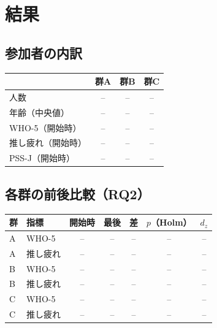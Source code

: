 \section{結果}

\subsection{参加者の内訳}

\begin{table}[t]
\centering
{}
\label{tab:groups}
\small
\begin{tabular}{@{}lccc@{}}
\toprule
 & 群A & 群B & 群C \\
\midrule
人数 & -- & -- & -- \\
年齢（中央値） & -- & -- & -- \\
WHO-5（開始時） & -- & -- & -- \\
推し疲れ（開始時） & -- & -- & -- \\
PSS-J（開始時） & -- & -- & -- \\
\bottomrule
\end{tabular}
\end{table}

\subsection{各群の前後比較（RQ2）}

\begin{table}[t]
\centering
{}
\label{tab:prepost}
\small
\begin{tabular}{@{}llccccc@{}}
\toprule
群 & 指標 & 開始時 & 最後 & 差 & $p$（Holm） & $d_z$ \\
\midrule
A & WHO-5 & -- & -- & -- & -- & -- \\
A & 推し疲れ & -- & -- & -- & -- & -- \\
B & WHO-5 & -- & -- & -- & -- & -- \\
B & 推し疲れ & -- & -- & -- & -- & -- \\
C & WHO-5 & -- & -- & -- & -- & -- \\
C & 推し疲れ & -- & -- & -- & -- & -- \\
\bottomrule
\end{tabular}
\end{table}

